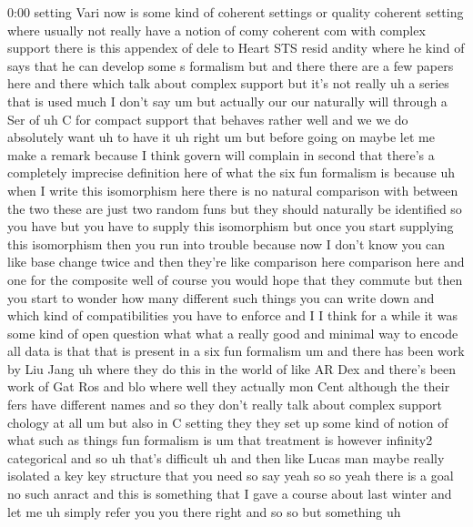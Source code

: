 \begin{unfinished}{0:00}
setting  Vari  now  is  some  kind  of
coherent  settings  or  quality  coherent
setting  where  usually  not  really  have  a
notion  of  comy  coherent  com  with  complex
support  there  is  this  appendex  of  dele
to  Heart  STS  resid  andity  where  he  kind
of  says  that  he  can  develop  some  s
formalism
but  and  there  there  are  a  few  papers
here  and  there  which  talk
about  complex  support  but  it's  not
really  uh  a  series  that  is  used  much  I
don't  say  um  but  actually  our  our
naturally  will  through  a  Ser  of  uh  C  for
compact  support  that  behaves  rather  well
and  we  we  do  absolutely  want  uh  to  have
it
uh  right  um  but  before  going  on  maybe
let  me  make  a  remark  because  I  think
govern  will  complain  in  second  that
there's  a  completely  imprecise
definition  here  of  what  the  six  fun
formalism  is  because
uh  when  I  write  this  isomorphism  here
there  is  no  natural  comparison  with
between  the  two  these  are  just  two
random
funs  but  they  should  naturally  be
identified  so  you  have  but  you  have  to
supply  this  isomorphism  but  once  you
start  supplying  this  isomorphism  then
you  run  into  trouble  because  now  I  don't
know  you  can  like  base  change  twice  and
then  they're  like  comparison  here
comparison  here  and  one  for  the
composite  well  of  course  you  would  hope
that  they  commute  but  then  you  start  to
wonder  how  many  different  such  things
you  can  write  down  and  which  kind  of
compatibilities  you  have  to  enforce
and
I  I  think  for  a  while  it  was  some  kind
of  open  question  what  what  a  really  good
and  minimal  way  to  encode  all  data  is
that  that  is  present  in  a  six  fun
formalism
um  and  there  has  been  work  by  Liu  Jang
uh  where  they  do  this  in  the  world  of
like  AR  Dex  and  there's  been  work  of  Gat
Ros  and
blo  where  well  they  actually  mon  Cent
although
the  their  fers  have  different  names  and
so  they  don't  really  talk  about  complex
support  chology  at  all
um  but  also  in  C  setting  they  they  set
up  some  kind  of  notion  of  what  such  as
things  fun  formalism  is
um  that  treatment  is  however  infinity2
categorical  and  so  uh  that's  difficult
uh  and
then  like  Lucas  man  maybe  really
isolated  a  key  key  structure  that  you
need  so  say  yeah
so  so  yeah  there  is  a
goal
no  such
anract  and  this  is  something  that  I  gave
a  course  about  last  winter  and  let  me  uh
simply  refer  you  you
there  right  and  so  so  but  something  uh

\end{unfinished}
